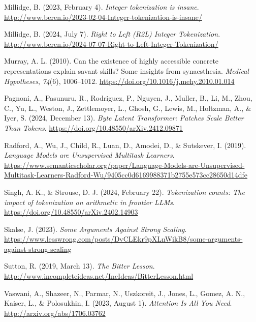 \documentclass[
  a4paper, twoside, 10pt, titlepage]{book}
\newlength{\cslhangindent}
\newenvironment{CSLReferences}[2] %
 {\begin{list}{}{%
  \setlength{\itemindent}{0pt}
  \setlength{\leftmargin}{0pt}
  \setlength{\parsep}{0pt}
  \ifodd #1
   \setlength{\leftmargin}{\cslhangindent}
   \setlength{\itemindent}{-1\cslhangindent}
  \fi
  \setlength{\itemsep}{#2\baselineskip}}}
 {\end{list}}
\begin{document}
\begin{CSLReferences}{1}{0}
Millidge, B. (2023, February 4). \emph{Integer tokenization is insane}.
\url{http://www.beren.io/2023-02-04-Integer-tokenization-is-insane/}

Millidge, B. (2024, July 7). \emph{Right to {Left} ({R2L}) {Integer
Tokenization}}.
\url{http://www.beren.io/2024-07-07-Right-to-Left-Integer-Tokenization/}

Murray, A. L. (2010). Can the existence of highly accessible concrete
representations explain savant skills? {Some} insights from
synaesthesia. \emph{Medical Hypotheses}, \emph{74}(6), 1006--1012.
\url{https://doi.org/10.1016/j.mehy.2010.01.014}

Pagnoni, A., Pasunuru, R., Rodriguez, P., Nguyen, J., Muller, B., Li,
M., Zhou, C., Yu, L., Weston, J., Zettlemoyer, L., Ghosh, G., Lewis, M.,
Holtzman, A., \& Iyer, S. (2024, December 13). \emph{Byte {Latent
Transformer}: {Patches Scale Better Than Tokens}}.
\url{https://doi.org/10.48550/arXiv.2412.09871}

Radford, A., Wu, J., Child, R., Luan, D., Amodei, D., \& Sutskever, I.
(2019). \emph{Language {Models} are {Unsupervised Multitask Learners}}.
\url{https://www.semanticscholar.org/paper/Language-Models-are-Unsupervised-Multitask-Learners-Radford-Wu/9405cc0d6169988371b2755e573cc28650d14dfe}

Singh, A. K., \& Strouse, D. J. (2024, February 22). \emph{Tokenization
counts: The impact of tokenization on arithmetic in frontier {LLMs}}.
\url{https://doi.org/10.48550/arXiv.2402.14903}

Skalse, J. (2023). \emph{Some {Arguments Against Strong Scaling}}.
\url{https://www.lesswrong.com/posts/DvCLEkr9pXLnWikB8/some-arguments-against-strong-scaling}

Sutton, R. (2019, March 13). \emph{The {Bitter Lesson}}.
\url{http://www.incompleteideas.net/IncIdeas/BitterLesson.html}

Vaswani, A., Shazeer, N., Parmar, N., Uszkoreit, J., Jones, L., Gomez,
A. N., Kaiser, L., \& Polosukhin, I. (2023, August 1). \emph{Attention
{Is All You Need}}. \url{http://arxiv.org/abs/1706.03762}

\end{CSLReferences}

\backmatter
\end{document}
